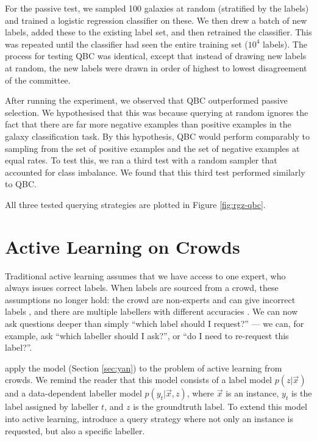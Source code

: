     For the passive test, we sampled 100 galaxies at random (stratified by the
    labels) and trained a logistic regression classifier on these. We then drew
    a batch of new labels, added these to the existing label set, and then
    retrained the classifier. This was repeated until the classifier had seen
    the entire training set ($10^4$ labels). The process for testing QBC was
    identical, except that instead of drawing new labels at random, the new
    labels were drawn in order of highest to lowest disagreement of the
    committee.

    After running the experiment, we observed that QBC outperformed passive
    selection. We hypothesised that this was because querying at random ignores
    the fact that there are far more negative examples than positive examples in
    the galaxy classification task. By this hypothesis, QBC would perform
    comparably to sampling from the set of positive examples and the set of
    negative examples at equal rates. To test this, we ran a third test with a
    random sampler that accounted for class imbalance. We found that this third
    test performed similarly to QBC.

    All three tested querying strategies are plotted in Figure
    \ref{fig:rgz-qbc}.

\section{Active Learning on Crowds}
\label{sec:active-learning-on-crowds}
    
    Traditional active learning assumes that we have access to one expert, who
    always issues correct labels. When labels are sourced from a crowd, these
    assumptions no longer hold: the crowd are non-experts and can give incorrect
    labels \citep{mozafari12,yan11}, and there are multiple labellers with
    different accuracies \citep{yan11}. We can now ask questions deeper than
    simply ``which label should I request?'' --- we can, for example, ask
    ``which labeller should I ask?'', or ``do I need to re-request this
    label?''.

    \citet{yan11} apply the \citet{yan10} model (Section \ref{sec:yan}) to the
    problem of active learning from crowds. We remind the reader that this model
    consists of a label model $p(z | \vec x)$ and a data-dependent labeller
    model $p(y_t | \vec x, z)$, where $\vec x$ is an instance, $y_t$ is the
    label assigned by labeller $t$, and $z$ is the groundtruth label. To extend
    this model into active learning, \citeauthor{yan11} introduce a query
    strategy where not only an instance is requested, but also a specific
    labeller.

